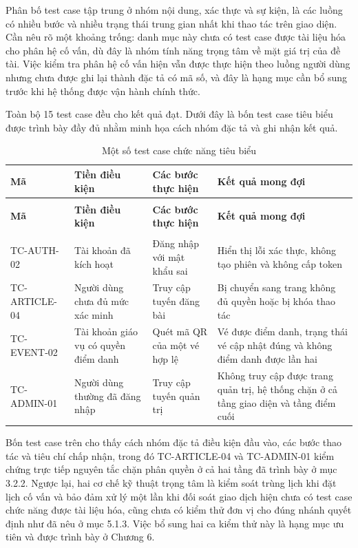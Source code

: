 \documentclass[12pt,a4paper,oneside]{report}
\begin{document}
Phân bố test case tập trung ở nhóm nội dung, xác thực và sự kiện, là các luồng có nhiều bước và nhiều trạng thái trung gian nhất khi thao tác trên giao diện. Cần nêu rõ một khoảng trống: danh mục này chưa có test case được tài liệu hóa cho phân hệ cố vấn, dù đây là nhóm tính năng trọng tâm về mặt giá trị của đề tài. Việc kiểm tra phân hệ cố vấn hiện vẫn được thực hiện theo luồng người dùng nhưng chưa được ghi lại thành đặc tả có mã số, và đây là hạng mục cần bổ sung trước khi hệ thống được vận hành chính thức.

Toàn bộ 15 test case đều cho kết quả đạt. Dưới đây là bốn test case tiêu biểu được trình bày đầy đủ nhằm minh họa cách nhóm đặc tả và ghi nhận kết quả.

\renewcommand{\arraystretch}{1.25}
{\small
\begin{longtable}{|>{\raggedright\arraybackslash}p{2.3cm}|>{\raggedright\arraybackslash}p{3.0cm}|>{\raggedright\arraybackslash}p{4.2cm}|>{\raggedright\arraybackslash}p{4.4cm}|}
\caption{Một số test case chức năng tiêu biểu}\label{tab:sampletc}\\
\hline \textbf{Mã} & \textbf{Tiền điều kiện} & \textbf{Các bước thực hiện} & \textbf{Kết quả mong đợi} \\ \hline
\endfirsthead
\multicolumn{4}{l}{\itshape\small (tiếp theo trang trước)}\\[2pt]
\hline \textbf{Mã} & \textbf{Tiền điều kiện} & \textbf{Các bước thực hiện} & \textbf{Kết quả mong đợi} \\ \hline
\endhead
\hline \multicolumn{4}{r}{\itshape\small (còn tiếp)}\\
\endfoot
\hline
\endlastfoot
TC-AUTH-02 & Tài khoản đã kích hoạt & Đăng nhập với mật khẩu sai & Hiển thị lỗi xác thực, không tạo phiên và không cấp token \\ \hline
TC-ARTICLE-04 & Người dùng chưa đủ mức xác minh & Truy cập tuyến đăng bài & Bị chuyển sang trang không đủ quyền hoặc bị khóa thao tác \\ \hline
TC-EVENT-02 & Tài khoản giáo vụ có quyền điểm danh & Quét mã QR của một vé hợp lệ & Vé được điểm danh, trạng thái vé cập nhật đúng và không điểm danh được lần hai \\ \hline
TC-ADMIN-01 & Người dùng thường đã đăng nhập & Truy cập tuyến quản trị & Không truy cập được trang quản trị, hệ thống chặn ở cả tầng giao diện và tầng điểm cuối \\ \hline
\end{longtable}
}
\renewcommand{\arraystretch}{1}

Bốn test case trên cho thấy cách nhóm đặc tả điều kiện đầu vào, các bước thao tác và tiêu chí chấp nhận, trong đó TC-ARTICLE-04 và TC-ADMIN-01 kiểm chứng trực tiếp nguyên tắc chặn phân quyền ở cả hai tầng đã trình bày ở mục 3.2.2. Ngược lại, hai cơ chế kỹ thuật trọng tâm là kiểm soát trùng lịch khi đặt lịch cố vấn và bảo đảm xử lý một lần khi đối soát giao dịch hiện chưa có test case chức năng được tài liệu hóa, cũng chưa có kiểm thử đơn vị cho đúng nhánh quyết định như đã nêu ở mục 5.1.3. Việc bổ sung hai ca kiểm thử này là hạng mục ưu tiên và được trình bày ở Chương 6.
\end{document}
